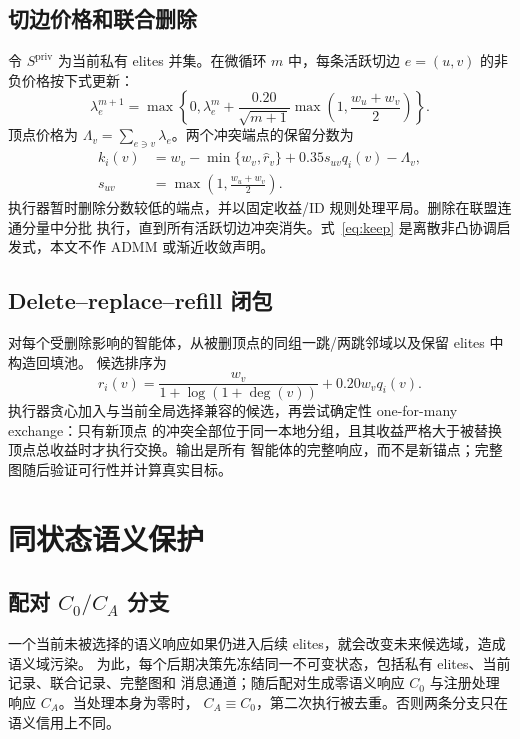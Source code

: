 \subsection{切边价格和联合删除}

令 $S^{\mathrm{priv}}$ 为当前私有 elites 并集。在微循环 $m$ 中，每条活跃切边
$e=(u,v)$ 的非负价格按下式更新：
\begin{equation}
\lambda_e^{m+1}=\max\left\{0,\lambda_e^m+
\frac{0.20}{\sqrt{m+1}}\max\left(1,\frac{w_u+w_v}{2}\right)\right\}.
\end{equation}
顶点价格为 $\Lambda_v=\sum_{e\ni v}\lambda_e$。两个冲突端点的保留分数为
\begin{equation}
\begin{aligned}
k_i(v)&=w_v-\min\{w_v,\widehat r_v\}
+0.35s_{uv}q_i(v)-\Lambda_v,\\
s_{uv}&=\max\left(1,\frac{w_u+w_v}{2}\right).
\end{aligned}
\label{eq:keep}
\end{equation}
执行器暂时删除分数较低的端点，并以固定收益/ID 规则处理平局。删除在联盟连通分量中分批
执行，直到所有活跃切边冲突消失。式~\eqref{eq:keep} 是离散非凸协调启发式，本文不作
ADMM 或渐近收敛声明。

\subsection{Delete--replace--refill 闭包}

对每个受删除影响的智能体，从被删顶点的同组一跳/两跳邻域以及保留 elites 中构造回填池。
候选排序为
\begin{equation}
r_i(v)=\frac{w_v}{1+\log(1+\deg(v))}+0.20w_vq_i(v).
\end{equation}
执行器贪心加入与当前全局选择兼容的候选，再尝试确定性 one-for-many exchange：只有新顶点
的冲突全部位于同一本地分组，且其收益严格大于被替换顶点总收益时才执行交换。输出是所有
智能体的完整响应，而不是新锚点；完整图随后验证可行性并计算真实目标。

\section{同状态语义保护}

\subsection{配对 \texorpdfstring{$C_0/C_A$}{C0/CA} 分支}

一个当前未被选择的语义响应如果仍进入后续 elites，就会改变未来候选域，造成语义域污染。
为此，每个后期决策先冻结同一不可变状态，包括私有 elites、当前记录、联合记录、完整图和
消息通道；随后配对生成零语义响应 $C_0$ 与注册处理响应 $C_A$。当处理本身为零时，
$C_A\equiv C_0$，第二次执行被去重。否则两条分支只在语义信用上不同。

